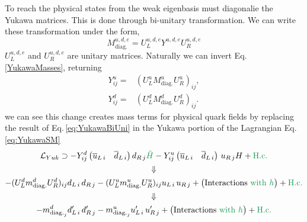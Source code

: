 To reach the physical states  from the weak eigenbasis  must diagonalie the Yukawa matrices. This is done through  bi-unitary transformation. 
% 
We can write these transformation under the form,
%
\begin{equation}
\label{YukawaMasses} 
M^{u,d,e}_{\text{diag.}}= U^{u,d,e}_L Y^{u,d,e} U^{u,d,e}_R 
\end{equation} 
%
 $U^{u,d,e}_L$ and $U^{u,d,e}_R$ are   unitary matrices. 
%
%
%
%
Naturally\Joaoadd{,} we can invert Eq.\,\eqref{YukawaMasses}, returning  
\begin{equation}\label{eq:YukawaBiUni}
\begin{aligned}
Y^u_{ij} = &  (U_L^u M^u_{\text{diag.}} U_R^u)_{ij}, \\
Y^d_{ij} = &  (U_L^d M^d_{\text{diag.}} U_R^d)_{ij}.
\end{aligned}
\end{equation}
%
 we can see this change creates mass terms for physical quark fields by replacing the result of Eq.\,\eqref{eq:YukawaBiUni} in the Yukawa portion of the Lagrangian Eq.\,\eqref{eq:YukawaSM}
%
\begin{gather}
\mathcal{L}_{Yuk} \supset 
- Y^d_{ij} \begin{pmatrix} \overline{u}_{L\,i} & \overline{d}_{L\,i}  \end{pmatrix}  d_{R\,j} \Joaoadd{\tilde{H}} 
%
- Y^u_{ij} \begin{pmatrix} \overline{u}_{L\,i} & \overline{d}_{L\,i}  \end{pmatrix} \, u_{R\,j} H + \Joaoadd{\mathrm{H.c.}} \nonumber  \\ 
 \Downarrow \nonumber \\
-(U_L^d m^d_{\text{diag.}} U_R^d)_{ij} d_{L\,i} \, d_{R\,j}  - (U_L^u m^u_{\text{diag.}} U_R^u)_{ij} u_{L\,i} \, u_{R\,j} + \big(\text{Interactions \Joaoadd{with $h$}}\big) + \Joaoadd{\mathrm{H.c.}} \\ 
 \Downarrow  \nonumber \\ 
-m^d_{\text{diag.}_j} d_{L\,i}^\prime \, d_{R\,j}^\prime  - m^u_{\text{diag.}_j} u_{L\,i}^\prime \, u_{R\,j}^\prime + \big(\text{Interactions \Joaoadd{with $h$}}\big) + \Joaoadd{\mathrm{H.c.}}  \nonumber  
\end{gather}
